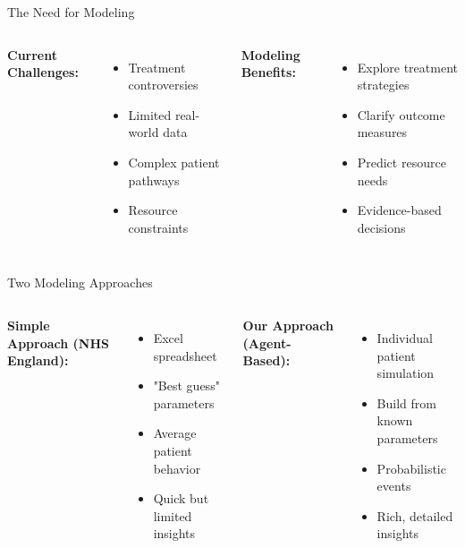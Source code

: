 \documentclass[10pt,aspectratio=169]{beamer}
\begin{document}
\begin{frame}{The Need for Modeling}
\begin{columns}[T]
\textbf{Current Challenges:}
\begin{itemize}
    \item Treatment controversies
    \item Limited real-world data
    \item Complex patient pathways
    \item Resource constraints
\end{itemize}

\textbf{Modeling Benefits:}
\begin{itemize}
    \item Explore treatment strategies
    \item Clarify outcome measures
    \item Predict resource needs
    \item Evidence-based decisions
\end{itemize}
\end{columns}
\end{frame}

\begin{frame}{Two Modeling Approaches}
\begin{columns}[T]
\textbf{Simple Approach (NHS England):}
\begin{itemize}
    \item Excel spreadsheet
    \item "Best guess" parameters
    \item Average patient behavior
    \item Quick but limited insights
\end{itemize}

\textbf{Our Approach (Agent-Based):}
\begin{itemize}
    \item Individual patient simulation
    \item Build from known parameters
    \item Probabilistic events
    \item Rich, detailed insights
\end{itemize}
\end{columns}

\vspace{0.5cm}
\centering
{}
\end{frame}
\end{document}

